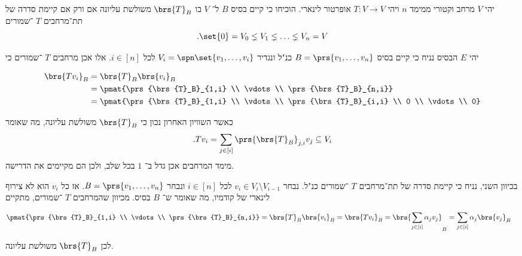\documentclass[article, 10pt,oneside]{article}
\begin{document}
\begin{exercise}
יהי
$V$
מרחב וקטורי ממימד
$n$
ויהי
$T \colon V \to V$
אופרטור לינארי.
הוכיחו כי קיים בסיס
$B$
ל־%
$V$
בו
$\brs{T}_B$
משולשת עליונה אם ורק אם קיימת סדרה של תת־מרחבים
$T$%
־שמורים
\[\text{.} \set{0} = V_0 \lneq V_1 \lneq \ldots \lneq V_n = V\]
\end{exercise}

\begin{solution}
יהי
$E$
הבסיס 
נניח כי קיים בסיס
$B = \prs{v_1, \ldots, v_n}$
כנ"ל ונגדיר
$V_i = \spn\set{v_1, \ldots, v_i}$
לכל
$i \in [n]$.
אלו אכן מרחבים
$T$%
־שמורים כי

\begin{otherlanguage}{english}
\begin{align*}
\brs{T v_i}_B &= \brs{T}_B \brs{v_i}_B
\\&= \pmat{\prs{\brs{T}_B}_{1,i} \\ \vdots \\ \prs{\brs{T}_B}_{n,i}}
\\&= \pmat{\prs{\brs{T}_B}_{1,i} \\ \vdots \\ \prs{\brs{T}_B}_{i,i} \\ 0 \\ \vdots \\ 0}
\end{align*}
\end{otherlanguage}

כאשר השוויון האחרון נכון כי
$\brs{T}_B$
משולשת עליונה, מה שאומר
\[\text{.} T v_i = \sum_{j \in [i]} \prs{\brs{T}_B}_{j,i} v_j \subseteq V_i\]
מימד המרחבים אכן גדל ב־%
$1$
בכל שלב, ולכן הם מקיימים את הדרישה.

בכיוון השני, נניח כי קיימת סדרה של תת־מרחבים
$T$%
־שמורים כנ"ל. נבחר
$v_i \in V_i \setminus V_{i-1}$
לכל
$i \in [n]$
ונבחר
$B = \prs{v_1, \ldots, v_n}$.
אז כל
$v_i$
הוא לא צירוף לינארי של קודמיו, מה שאומר ש־%
$B$
בסיס.
מכיוון שהמרחבים
$T$%
־שמורים, מתקיים

\begin{otherlanguage}{english}
\begin{align*}
\pmat{\prs{\brs{T}_B}_{1,i} \\ \vdots \\ \prs{\brs{T}_B}_{n,i}} &= \brs{T}_B \brs{v_i}_B
= \brs{T v_i}_B = \brs{\sum_{j \in [i]} \alpha_j v_j}_B = \sum_{j \in [i]} \alpha_j \brs{v_j}_B
\end{align*}
\end{otherlanguage}

לכן
$\brs{T}_B$
משולשת עליונה.
\end{solution}
\end{document}

